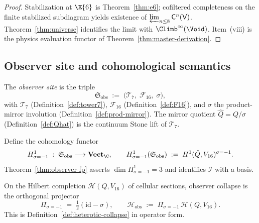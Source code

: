 \begin{proof}
Stabilization at $\E{6}$ is Theorem~\ref{thm:e6}; cofiltered completeness on
the finite stabilized subdiagram yields existence of
$\varprojlim_{n\leq 8}\mathsf{C}^{n}(\mathsf{V})$. Theorem~\ref{thm:universe}
identifies the limit with $\Climb^\infty(\Void)$. Item~(viii) is the physics
evaluation functor of Theorem~\ref{thm:master-derivation}.
\end{proof}

\subsection{Observer site and cohomological semantics}
\label{sec:formal-foundations:site}

\begin{definition}\label{def:observer-site}
The \emph{observer site} is the triple
\begin{equation}\label{eq:observer-site}
  \mathfrak{S}_{\mathrm{obs}}
  \;:=\;
  \bigl(
    \mathcal{T}_7,\;
    \mathcal{F}_{16},\;
    \sigma
  \bigr),
\end{equation}
with $\mathcal{T}_7$ (Definition~\ref{def:tower7}),
$\mathcal{F}_{16}$ (Definition~\ref{def:F16}), and $\sigma$ the product-mirror
involution (Definition~\ref{def:prod-mirror}). The mirror quotient
$\hat Q=Q/\sigma$ (Definition~\ref{def:Qhat}) is the continuum Stone lift of
$\mathcal{T}_7$.
\end{definition}

\begin{definition}\label{def:cohomology-functor}
Define the cohomology functor
\begin{equation}\label{eq:cohomology-functor}
  H^1_{\sigma=-1}
  \;:\;
  \mathfrak{S}_{\mathrm{obs}}
  \longrightarrow
  \mathbf{Vect}_\C,
  \qquad
  H^1_{\sigma=-1}(\mathfrak{S}_{\mathrm{obs}})
  \;:=\;
  H^1(\hat Q,V_{16})^{\sigma=-1}.
\end{equation}
Theorem~\ref{thm:observer-fp} asserts
$\dim H^1_{\sigma=-1}=3$ and identifies $\mathcal{I}$ with a basis.
\end{definition}

\begin{definition}\label{def:collapse-projector}
On the Hilbert completion $\mathcal{H}(Q,V_{16})$ of cellular sections,
observer collapse is the orthogonal projector
\begin{equation}\label{eq:formal-Pi}
  \Pi_{\sigma=-1}
  \;=\;
  \tfrac12(\mathrm{id}-\sigma),
  \qquad
  \mathcal{H}_{\mathrm{obs}}
  \;:=\;
  \Pi_{\sigma=-1}\,\mathcal{H}(Q,V_{16}).
\end{equation}
This is Definition~\ref{def:heterotic-collapse} in operator form.
\end{definition}

